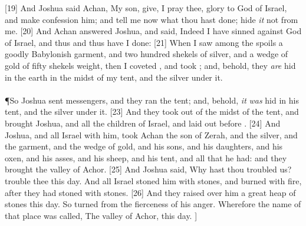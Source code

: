 [19] \textcolor[cmyk]{0.99998,1,0,0}{And Joshua said  Achan, My son, give, I pray thee, glory to  God of Israel, and make confession  him; and tell me now what thou hast done; hide \emph{it} not from me.}
[20] \textcolor[cmyk]{0.99998,1,0,0}{And Achan answered Joshua, and said, Indeed I have sinned against  God of Israel, and thus and thus have I done:}
[21] \textcolor[cmyk]{0.99998,1,0,0}{When I saw among the spoils a goodly Babylonish garment, and two hundred shekels of silver, and a wedge of gold of fifty shekels weight, then I coveted , and took ; and, behold, they \emph{are} hid in the earth in the midst of my tent, and the silver under it.}\\
\\
\P \textcolor[cmyk]{0.99998,1,0,0}{So Joshua sent messengers, and they ran  the tent; and, behold, \emph{it} \emph{was} hid in his tent, and the silver under it.}
[23] \textcolor[cmyk]{0.99998,1,0,0}{And they took  out of the midst of the tent, and brought   Joshua, and  all the children of Israel, and laid  out before .}
[24] \textcolor[cmyk]{0.99998,1,0,0}{And Joshua, and all Israel with him, took Achan the son of Zerah, and the silver, and the garment, and the wedge of gold, and his sons, and his daughters, and his oxen, and his asses, and his sheep, and his tent, and all that he had: and they brought   the valley of Achor.}
[25] \textcolor[cmyk]{0.99998,1,0,0}{And Joshua said, Why hast thou troubled us?   trouble thee this day. And all Israel stoned him with stones, and burned  with fire, after they had stoned  with stones.}
[26] \textcolor[cmyk]{0.99998,1,0,0}{And they raised over him a great heap of stones  this day. So  turned from the fierceness of his anger. Wherefore the name of that place was called, The valley of Achor,  this day.}
]       


